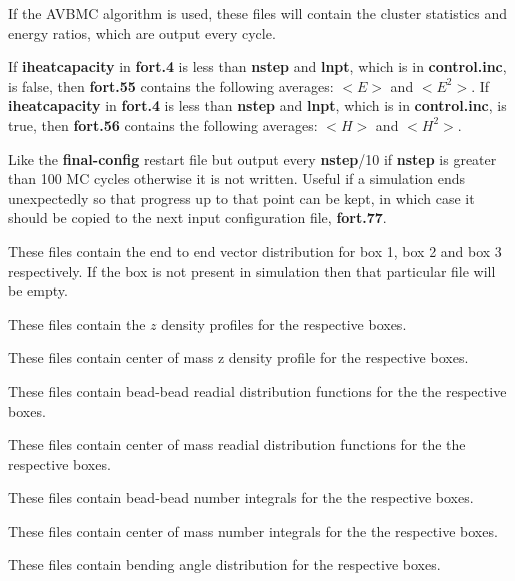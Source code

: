 \documentclass[12pt,letterpaper]{article}
\begin{document}
{{{{{{{
If the AVBMC algorithm is used, these files will contain the cluster statistics and energy ratios,
which are output every cycle.

If {\textbf{iheatcapacity}} in {\bf fort.4} is less than {\textbf{nstep}} and {\textbf{lnpt}}, which is in {\textbf{control.inc}}, 
is false, then {\textbf{fort.55}} contains the following averages: $<E>$ and $<E^2>$.
If {\textbf{iheatcapacity}} in {\bf fort.4} is less than {\textbf{nstep}} and {\textbf{lnpt}}, which is in {\textbf{control.inc}}, 
is true, then {\textbf{fort.56}} contains the following averages: $<H>$ and $<H^2>$.

Like the {\bf final-config} restart file but output every {{\bf{nstep}}/10}
if {\bf{nstep}} is greater than 100 MC cycles otherwise it is not
written. Useful if a simulation ends unexpectedly so that
progress up to that point can be kept, in which case it should be
copied to the next input configuration file, {\bf fort.77}.

 These files contain the end to
end vector distribution for box 1, box 2 and box 3 respectively. If the box is not present
in simulation then that particular file will be empty.

 These files contain the $z$ density profiles 
for the respective boxes.

 These files contain
center of mass z density profile for the respective boxes.

 These files contain
bead-bead readial distribution functions for the the respective boxes.

 These files contain
center of mass readial distribution functions for the the respective boxes.

 These files contain
bead-bead number integrals for the the respective boxes.

 These files contain
center of mass number integrals for the the respective boxes.

 These files contain bending angle distribution
for the respective boxes.

}}}}}}}
\end{document}
